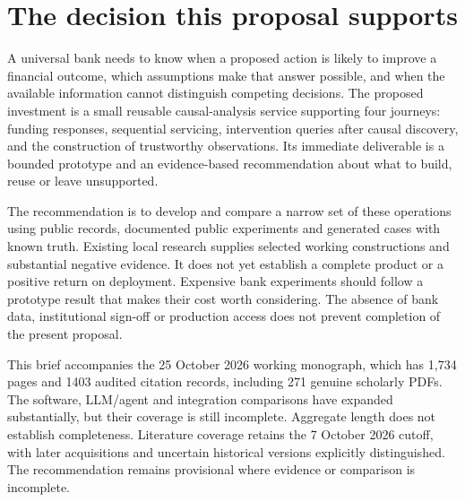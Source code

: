 \hypertarget{the-decision-this-proposal-supports}{%
\section{The decision this proposal
supports}\label{the-decision-this-proposal-supports}}

A universal bank needs to know when a proposed action is likely to
improve a financial outcome, which assumptions make that answer
possible, and when the available information cannot distinguish
competing decisions. The proposed investment is a small reusable
causal-analysis service supporting four journeys: funding responses,
sequential servicing, intervention queries after causal discovery, and
the construction of trustworthy observations. Its immediate deliverable
is a bounded prototype and an evidence-based recommendation about what
to build, reuse or leave unsupported.

The recommendation is to develop and compare a narrow set of these
operations using public records, documented public experiments and
generated cases with known truth. Existing local research supplies
selected working constructions and substantial negative evidence. It
does not yet establish a complete product or a positive return on
deployment. Expensive bank experiments should follow a prototype result
that makes their cost worth considering. The absence of bank data,
institutional sign-off or production access does not prevent completion
of the present proposal. \citep{sp13_scope}

This brief accompanies the 25 October 2026 working monograph, which has
1,734 pages and 1403 audited citation records, including 271 genuine
scholarly PDFs. The software, LLM/agent and integration comparisons have
expanded substantially, but their coverage is still incomplete.
Aggregate length does not establish completeness. Literature coverage
retains the 7 October 2026 cutoff, with later acquisitions and uncertain
historical versions explicitly distinguished. The recommendation remains
provisional where evidence or comparison is incomplete.
\citep{sp23nt_reader,sp23lt_reader,sp23dw_reader,sp23sm_reader,sp22wf_reader,sp22ft_reader,sp22si_reader,sp22ob_reader,sp22dk_reader,sp22iv_reader,sp22bs_reader,sp21rr_reader,sp21pr_reader,sp21gs_reader,sp21eo_reader,sp21tr_reader,sp21ae_reader,sp21gr_reader,sp21ck_reader,sp21cx_reader,sp20md_reader,sp20gf_reader,sp20hy_reader,sp20je_reader,sp20nc_reader,sp20gc_reader,sp20ea_reader,sp20vm_reader,sp20pye_reader,sp20fx_reader,sp20pa_reader,sp20rfx_reader}

